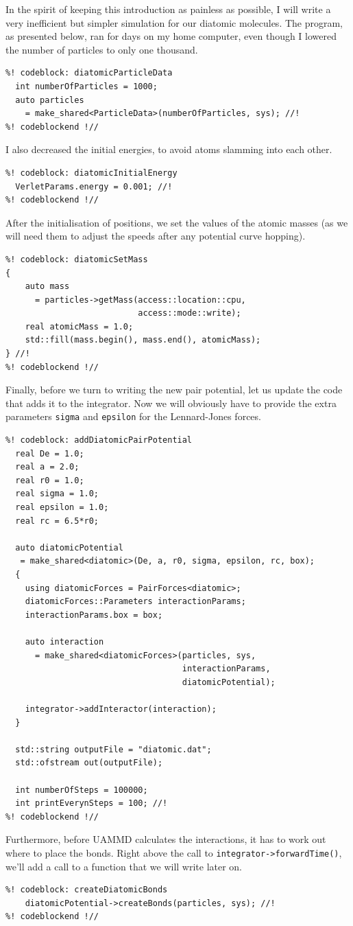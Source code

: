 In the spirit of keeping this introduction as painless as possible, I will write 
a very inefficient but simpler simulation for our diatomic molecules. The 
program, as presented below, ran for days on my home computer, even though I 
lowered the number of particles to only one thousand.
\begin{lstlisting}
%! codeblock: diatomicParticleData
  int numberOfParticles = 1000;
  auto particles
    = make_shared<ParticleData>(numberOfParticles, sys); //!
%! codeblockend !//
\end{lstlisting}
I also decreased the initial energies, to avoid atoms slamming into each other.
\begin{lstlisting}
%! codeblock: diatomicInitialEnergy
  VerletParams.energy = 0.001; //!
%! codeblockend !//
\end{lstlisting}
After the initialisation of positions, we set the values of the atomic masses 
(as we will need them to adjust the speeds after any potential curve hopping).
\begin{lstlisting}
%! codeblock: diatomicSetMass
{
    auto mass
      = particles->getMass(access::location::cpu,
                           access::mode::write);
    real atomicMass = 1.0;
    std::fill(mass.begin(), mass.end(), atomicMass);
} //!
%! codeblockend !//
\end{lstlisting}
Finally, before we turn to writing the new pair potential, let us update the 
code that adds it to the integrator. Now we will obviously have to provide the 
extra parameters \texttt{sigma} and \texttt{epsilon} for the Lennard-Jones 
forces.
\begin{lstlisting}
%! codeblock: addDiatomicPairPotential
  real De = 1.0;
  real a = 2.0;
  real r0 = 1.0;
  real sigma = 1.0;
  real epsilon = 1.0;
  real rc = 6.5*r0;

  auto diatomicPotential
   = make_shared<diatomic>(De, a, r0, sigma, epsilon, rc, box);
  {
    using diatomicForces = PairForces<diatomic>;
    diatomicForces::Parameters interactionParams;
    interactionParams.box = box;

    auto interaction
      = make_shared<diatomicForces>(particles, sys,
                                    interactionParams,
                                    diatomicPotential);

    integrator->addInteractor(interaction);
  }

  std::string outputFile = "diatomic.dat";
  std::ofstream out(outputFile);

  int numberOfSteps = 100000;
  int printEverynSteps = 100; //!
%! codeblockend !//
\end{lstlisting}
Furthermore, before UAMMD calculates the interactions, it has to work out where 
to place the bonds. Right above the call to \texttt{integrator->forwardTime()}, 
we'll add a call to a function that we will write later on.
\begin{lstlisting}
%! codeblock: createDiatomicBonds
    diatomicPotential->createBonds(particles, sys); //!
%! codeblockend !//
\end{lstlisting}

